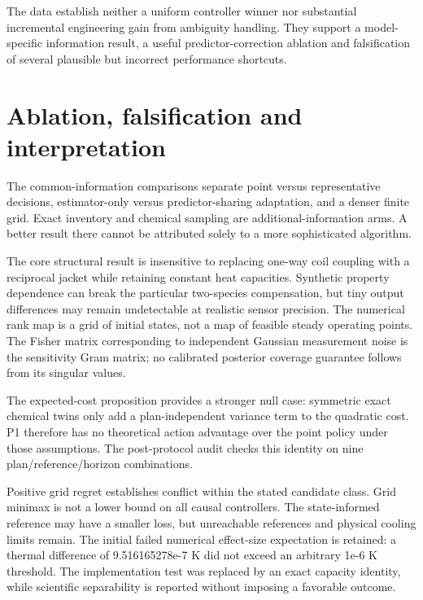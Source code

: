 \documentclass[
  11pt,
]{article}
\begin{document}
The data establish neither a uniform controller winner nor substantial
incremental engineering gain from ambiguity handling. They support a
model-specific information result, a useful predictor-correction
ablation and falsification of several plausible but incorrect
performance shortcuts.

\hypertarget{ablation-falsification-and-interpretation}{%
\section{Ablation, falsification and
interpretation}\label{ablation-falsification-and-interpretation}}

The common-information comparisons separate point versus representative
decisions, estimator-only versus predictor-sharing adaptation, and a
denser finite grid. Exact inventory and chemical sampling are
additional-information arms. A better result there cannot be attributed
solely to a more sophisticated algorithm.

The core structural result is insensitive to replacing one-way coil
coupling with a reciprocal jacket while retaining constant heat
capacities. Synthetic property dependence can break the particular
two-species compensation, but tiny output differences may remain
undetectable at realistic sensor precision. The numerical rank map is a
grid of initial states, not a map of feasible steady operating points.
The Fisher matrix corresponding to independent Gaussian measurement
noise is the sensitivity Gram matrix; no calibrated posterior coverage
guarantee follows from its singular values.

The expected-cost proposition provides a stronger null case: symmetric
exact chemical twins only add a plan-independent variance term to the
quadratic cost. P1 therefore has no theoretical action advantage over
the point policy under those assumptions. The post-protocol audit checks
this identity on nine plan/reference/horizon combinations.

Positive grid regret establishes conflict within the stated candidate
class. Grid minimax is not a lower bound on all causal controllers. The
state-informed reference may have a smaller loss, but unreachable
references and physical cooling limits remain. The initial failed
numerical effect-size expectation is retained: a thermal difference of
9.516165278e-7 K did not exceed an arbitrary 1e-6 K threshold. The
implementation test was replaced by an exact capacity identity, while
scientific separability is reported without imposing a favorable
outcome.
\end{document}
